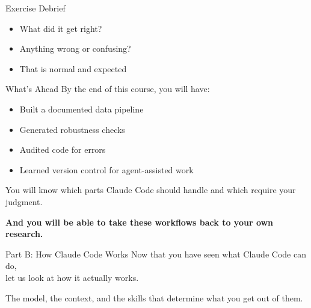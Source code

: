 \documentclass[aspectratio=169, 11pt]{beamer}
\begin{document}
\begin{frame}{Exercise Debrief}
  \begin{itemize}
    \item What did it get right?
    \item Anything wrong or confusing?
    \item That is normal and expected
  \end{itemize}
\end{frame}


\begin{frame}{What's Ahead}
  By the end of this course, you will have:
  \begin{itemize}
    \item Built a documented data pipeline
    \item Generated robustness checks
    \item Audited code for errors
    \item Learned version control for agent-assisted work
  \end{itemize}

  \vspace{0.5em}
  You will know which parts Claude Code should handle and which require your judgment.

  \vspace{0.5em}
  \textbf{And you will be able to take these workflows back to your own research.}
\end{frame}


\begin{frame}{Part B: How Claude Code Works}
  \centering
  \vspace{2em}
  {\Large Now that you have seen what Claude Code can do,\\[0.3em]
  let us look at how it actually works.}

  \vspace{2em}
  The model, the context, and the skills that determine what you get out of them.
\end{frame}
\end{document}

